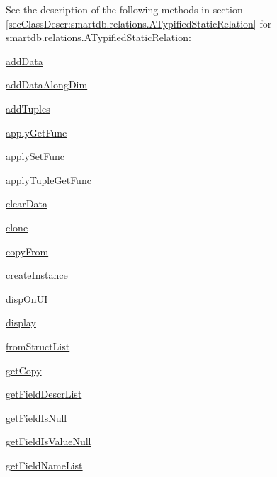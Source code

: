 See the description of the following methods in section \ref{secClassDescr:smartdb.relations.ATypifiedStaticRelation}
 for smartdb.relations.ATypifiedStaticRelation:

\begin{list}{}{}
 \item \hyperref[method:smartdb.relations.ATypifiedStaticRelation.addData]{addData}
 \item \hyperref[method:smartdb.relations.ATypifiedStaticRelation.addDataAlongDim]{addDataAlongDim}
 \item \hyperref[method:smartdb.relations.ATypifiedStaticRelation.addTuples]{addTuples}
 \item \hyperref[method:smartdb.relations.ATypifiedStaticRelation.applyGetFunc]{applyGetFunc}
 \item \hyperref[method:smartdb.relations.ATypifiedStaticRelation.applySetFunc]{applySetFunc}
 \item \hyperref[method:smartdb.relations.ATypifiedStaticRelation.applyTupleGetFunc]{applyTupleGetFunc}
 \item \hyperref[method:smartdb.relations.ATypifiedStaticRelation.clearData]{clearData}
 \item \hyperref[method:smartdb.relations.ATypifiedStaticRelation.clone]{clone}
 \item \hyperref[method:smartdb.relations.ATypifiedStaticRelation.copyFrom]{copyFrom}
 \item \hyperref[method:smartdb.relations.ATypifiedStaticRelation.createInstance]{createInstance}
 \item \hyperref[method:smartdb.relations.ATypifiedStaticRelation.dispOnUI]{dispOnUI}
 \item \hyperref[method:smartdb.relations.ATypifiedStaticRelation.display]{display}
 \item \hyperref[method:smartdb.relations.ATypifiedStaticRelation.fromStructList]{fromStructList}
 \item \hyperref[method:smartdb.relations.ATypifiedStaticRelation.getCopy]{getCopy}
 \item \hyperref[method:smartdb.relations.ATypifiedStaticRelation.getFieldDescrList]{getFieldDescrList}
 \item \hyperref[method:smartdb.relations.ATypifiedStaticRelation.getFieldIsNull]{getFieldIsNull}
 \item \hyperref[method:smartdb.relations.ATypifiedStaticRelation.getFieldIsValueNull]{getFieldIsValueNull}
 \item \hyperref[method:smartdb.relations.ATypifiedStaticRelation.getFieldNameList]{getFieldNameList}

\end{list}
